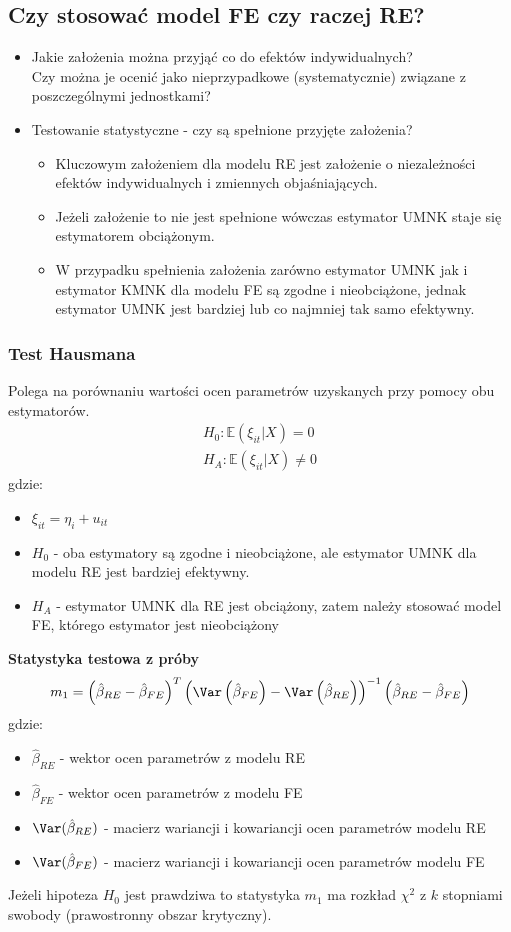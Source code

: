 \subsection{Czy stosować model FE czy raczej RE?}
\begin{itemize}
\item Jakie założenia można przyjąć co do efektów indywidualnych?\\
Czy można je ocenić jako nieprzypadkowe (systematycznie) związane z poszczególnymi jednostkami?
\item Testowanie statystyczne - czy są spełnione przyjęte założenia?
\begin{itemize}
\item Kluczowym założeniem dla modelu RE jest założenie o niezależności efektów indywidualnych i zmiennych objaśniających.
\item Jeżeli założenie to nie jest spełnione wówczas estymator UMNK staje się estymatorem obciążonym.
\item W przypadku spełnienia założenia zarówno estymator UMNK jak i estymator KMNK dla modelu FE są zgodne i nieobciążone, jednak estymator UMNK jest bardziej lub co najmniej tak samo efektywny.
\end{itemize}
\end{itemize}
\subsubsection{Test Hausmana}
Polega na porównaniu wartości ocen parametrów uzyskanych przy pomocy obu estymatorów.
\begin{gather*}
H_0:\mathbb E (\xi_{it}|X)=0\\
H_A:\mathbb E (\xi_{it}|X)\neq 0
\end{gather*}
gdzie:
\begin{itemize}
\item $ \xi_{it}=\eta_i+u_{it} $
\item $ H_0 $ - oba estymatory są zgodne i nieobciążone, ale estymator UMNK dla modelu RE jest bardziej efektywny.
\item $ H_A $ - estymator UMNK dla RE jest obciążony, zatem należy stosować model FE, którego estymator jest nieobciążony
\end{itemize}
\textbf{Statystyka testowa z próby}
\begin{gather*}
m_1=
\left(\hat{\beta}_{RE}-\hat{\beta}_{FE}\right)^T
\left(\Var\left(\hat{\beta}_{FE}\right)-\Var\left(\hat{\beta}_{RE}\right)\right)^{-1}
\left(\hat{\beta}_{RE}-\hat{\beta}_{FE}\right)
\end{gather*}
gdzie:
\begin{itemize}
\item $ \hat{\beta}_{RE} $ - wektor ocen parametrów z modelu RE
\item $ \hat{\beta}_{FE} $ - wektor ocen parametrów z modelu FE
\item $ \Var(\hat{\beta}_{RE}) $ - macierz wariancji i kowariancji ocen parametrów modelu RE
\item $ \Var(\hat{\beta}_{FE}) $ - macierz wariancji i kowariancji ocen parametrów modelu FE
\end{itemize}
Jeżeli hipoteza $ H_0 $ jest prawdziwa to statystyka $ m_1 $ ma rozkład $ \chi^2 $ z $ k $  stopniami swobody (prawostronny obszar krytyczny).
